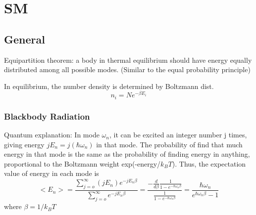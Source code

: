 \chapter{SM}
\section{General}
Equipartition theorem: a body in thermal equilibrium should have energy 
equally distributed among all possible modes. (Similar to the equal 
probability principle)

In equilibrium, the number density is determined by Boltzmann dist.
\begin{equation}
    \label{Boltzmann distribution}
    n_i = Ne^{-\beta E_i}
\end{equation}
\subsection{Blackbody Radiation}
Quantum explanation: In mode $\omega_n$, it can be excited an integer 
number j times, giving energy $jE_n = j(\hbar\omega_n)$ in that mode.
The probability of find that much energy in that mode is the same 
as the probability of finding energy in anything, proportional to 
the Boltzmann weight exp(-energy/$k_BT$). Thus, the expectation value of
energy in each mode is
\begin{equation}
    <E_n> = \frac{\sum_{j=o}^\infty(jE_n)e^{-jE_n\beta}}{\sum_{j=o}^\infty e^{-jE_n\beta}} = \frac{-\frac{d}{d\beta}\frac{1}{1-e^{-\hbar\omega_n\beta}}}{\frac{1}{1-e^{-\hbar\omega_n\beta}}} = \frac{\hbar\omega_n}{e^{\hbar\omega_n\beta}-1}
\end{equation}
where $\beta=1/k_BT$

